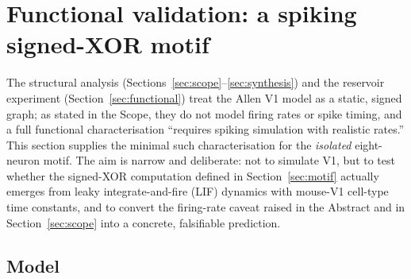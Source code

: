 %
%

\section{Functional validation: a spiking signed-XOR motif}
\label{sec:spiking}

The structural analysis (Sections~\ref{sec:scope}--\ref{sec:synthesis}) and
the reservoir experiment (Section~\ref{sec:functional}) treat the Allen V1
model as a static, signed graph; as stated in the Scope, they do not model
firing rates or spike timing, and a full functional characterisation
``requires spiking simulation with realistic rates.'' This section supplies
the minimal such characterisation for the \emph{isolated} eight-neuron motif.
The aim is narrow and deliberate: not to simulate V1, but to test whether the
signed-XOR computation defined in Section~\ref{sec:motif} actually emerges
from leaky integrate-and-fire (LIF) dynamics with mouse-V1 cell-type time
constants, and to convert the firing-rate caveat raised in the Abstract and in
Section~\ref{sec:scope} into a concrete, falsifiable prediction.

\subsection{Model}
\label{sec:spiking_model}

